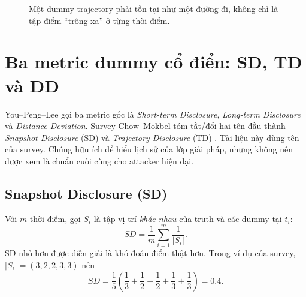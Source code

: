\documentclass[11pt,a4paper,oneside]{report}
\begin{document}
\begin{figure}[htbp]
\centering
{}
\caption{Một dummy trajectory phải tồn tại như một đường đi, không chỉ là tập điểm ``trông xa'' ở từng thời điểm.}
\label{fig:stable-dummy}
\end{figure}

\section{Ba metric dummy cổ điển: SD, TD và DD}

You--Peng--Lee gọi ba metric gốc là \emph{Short-term Disclosure}, \emph{Long-term
Disclosure} và \emph{Distance Deviation}. Survey Chow--Mokbel tóm tắt/đổi hai tên
đầu thành \emph{Snapshot Disclosure} (SD) và \emph{Trajectory Disclosure} (TD)
\cite{you2007dummies,chow2011trajectory}. Tài liệu này dùng tên của survey. Chúng
hữu ích để hiểu lịch sử của lớp giải pháp, nhưng không nên được xem là chuẩn cuối
cùng cho attacker hiện đại.

\subsection{Snapshot Disclosure (SD)}

Với $m$ thời điểm, gọi $S_i$ là tập vị trí \emph{khác nhau} của truth và các dummy
tại $t_i$:
\[
SD=\frac{1}{m}\sum_{i=1}^{m}\frac{1}{|S_i|}.
\]
SD nhỏ hơn được diễn giải là khó đoán điểm thật hơn. Trong ví dụ của survey,
$|S_i|=(3,2,2,3,3)$ nên
\[
SD=\frac{1}{5}\left(\frac13+\frac12+\frac12+\frac13+\frac13\right)=0.4.
\]
\end{document}
